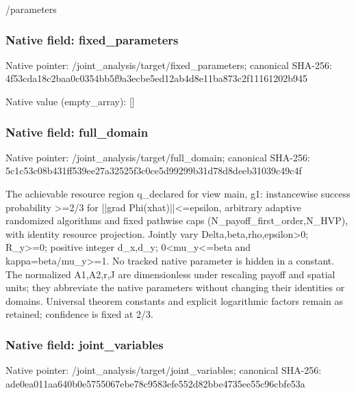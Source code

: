 \documentclass[10pt,a4paper]{article}
\begin{document}
\begingroup\raggedright\sloppy /\allowbreak{}parameters\par\endgroup

\subsubsection{Native field: fixed\_\allowbreak{}parameters}
Native pointer: /joint\_\allowbreak{}analysis/target/fixed\_\allowbreak{}parameters; canonical SHA-256: 4f53cda18c2baa0c0354bb5f9a3ecbe5ed12ab4d8e11ba873c2f11161202b945

Native value (empty\_\allowbreak{}array): []

\subsubsection{Native field: full\_\allowbreak{}domain}
Native pointer: /joint\_\allowbreak{}analysis/target/full\_\allowbreak{}domain; canonical SHA-256: 5c1c53c08b431ff539ee27a32525f3c0ce5d99299b31d78d8deeb31039c49c4f

\begingroup\raggedright\sloppy The achievable resource region q\_\allowbreak{}declared for view main,\allowbreak{} g1:\allowbreak{} instancewise success probability >=\allowbreak{}2/\allowbreak{}3 for ||grad Phi(xhat)||<=\allowbreak{}epsilon,\allowbreak{} arbitrary adaptive randomized algorithms and fixed pathwise caps (N\_\allowbreak{}payoff\_\allowbreak{}first\_\allowbreak{}order,\allowbreak{}N\_\allowbreak{}HVP),\allowbreak{} with identity resource projection. Jointly vary Delta,\allowbreak{}beta,\allowbreak{}rho,\allowbreak{}epsilon>0;\allowbreak{} R\_\allowbreak{}y>=\allowbreak{}0;\allowbreak{} positive integer d\_\allowbreak{}x,\allowbreak{}d\_\allowbreak{}y;\allowbreak{} 0<mu\_\allowbreak{}y<=\allowbreak{}beta and kappa=\allowbreak{}beta/\allowbreak{}mu\_\allowbreak{}y>=\allowbreak{}1. No tracked native parameter is hidden in a constant. The normalized A1,\allowbreak{}A2,\allowbreak{}r,\allowbreak{}J are dimensionless under rescaling payoff and spatial units;\allowbreak{} they abbreviate the native parameters without changing their identities or domains. Universal theorem constants and explicit logarithmic factors remain as retained;\allowbreak{} confidence is fixed at 2/\allowbreak{}3.\par\endgroup

\subsubsection{Native field: joint\_\allowbreak{}variables}
Native pointer: /joint\_\allowbreak{}analysis/target/joint\_\allowbreak{}variables; canonical SHA-256: ade0ea011aa640b0e5755067ebe78c9583efe552d82bbe4735ee55c96cbfe53a
\end{document}
